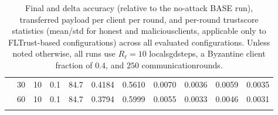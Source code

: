 \documentclass[11pt,twocolumn,a4paper,DIV=calc,parskip=half]{scrartcl}
\begin{document}
\begin{longtable}{@{}l c c c c c c c c c c@{}}
	& 30 & 10 & 0.1 & 84.7 & 0.4184 & 0.5610 & 0.0070 & 0.0036 & 0.0059 & 0.0035 \\
	& 60 & 10 & 0.1 & 84.7 & 0.3794 & 0.5999 & 0.0055 & 0.0033 & 0.0046 & 0.0031 \\
	\caption{Final and delta accuracy (relative to the no-attack BASE run), transferred payload per client per round, and per-round \gls{trustscore} statistics (mean/std for honest and \glspl{maliciousclient}, applicable only to FLTrust-based configurations) across all evaluated configurations. Unless noted otherwise, all runs use $R_\ell=10$ \glspl{localsgdstep}, a Byzantine client fraction of $0.4$, and $250$ \glspl{communicationround}.}
	\label{tab:accuracy-summary_exp3}
\end{longtable}
\end{document}
